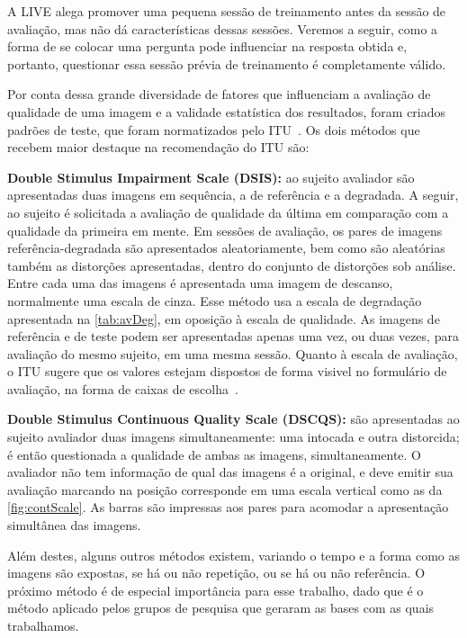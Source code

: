 A LIVE alega promover uma pequena sessão de treinamento antes da sessão de avaliação, mas não dá características dessas sessões. Veremos a seguir, como a forma de se colocar uma pergunta pode influenciar na resposta obtida e, portanto, questionar essa sessão prévia de treinamento é completamente válido.

Por conta dessa grande diversidade de fatores que influenciam a avaliação de qualidade de uma imagem e a validade estatística dos resultados, foram criados padrões de teste, que foram normatizados pelo ITU~\cite{itur2012}. Os dois métodos que recebem maior destaque na recomendação do ITU são:

\begin{description}
	\item{\textbf{Double Stimulus Impairment Scale (DSIS):}} ao sujeito avaliador são apresentadas duas imagens em sequência, a de referência e a degradada. A seguir, ao sujeito é solicitada a avaliação de qualidade da última em comparação com a qualidade da primeira em mente. Em sessões de avaliação, os pares de imagens referência-degradada são apresentados aleatoriamente, bem como são aleatórias também as distorções apresentadas, dentro do conjunto de distorções sob análise. Entre cada uma das imagens é apresentada uma imagem de descanso, normalmente uma escala de cinza. Esse método usa a escala de degradação apresentada na \autoref{tab:avDeg}, em oposição à escala de qualidade. As imagens de referência e de teste podem ser apresentadas apenas uma vez, ou duas vezes, para avaliação do mesmo sujeito, em uma mesma sessão. Quanto à escala de avaliação, o ITU sugere que os valores estejam dispostos de forma visivel no formulário de avaliação, na forma de caixas de escolha~\cite[p.12]{itur2012}.

	\item{\textbf{Double Stimulus Continuous Quality Scale (DSCQS):}} são apresentadas ao sujeito avaliador duas imagens simultaneamente: uma intocada e outra distorcida; é então questionada a qualidade de ambas as imagens, simultaneamente. O avaliador não tem informação de qual das imagens é a original, e deve emitir sua avaliação marcando na posição corresponde em uma escala vertical como as da \autoref{fig:contScale}. As barras são impressas aos pares para acomodar a apresentação simultânea das imagens.
\end{description}

Além destes, alguns outros métodos existem, variando o tempo e a forma como as imagens são expostas, se há ou não repetição, ou se há ou não referência. O próximo método é de especial importância para esse trabalho, dado que é o método aplicado pelos grupos de pesquisa que geraram as bases com as quais trabalhamos.


